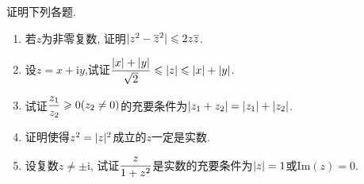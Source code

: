 \begin{yyEx}
	证明下列各题.
	\begin{enumerate}
		\item 若$z$为非零复数, 证明$\lvert z^2 - \overline{z}^2\rvert \leqslant 2z\overline{z}$.
		\item 设$z = x+\mathrm{i}y$,试证$\begin{lgathered}\frac{\abs{x}+\abs{y}}{\sqrt{2}}\leqslant \abs{z} \leqslant \abs{x}+\abs{y}\end{lgathered}$.
		\item 试证$\begin{lgathered}\frac{z_1}{z_2}\geqslant 0(z_2\neq 0)\end{lgathered}$的充要条件为$\lvert z_1+z_2\rvert = \lvert z_1\rvert+\lvert z_2\rvert$.
		\item 证明使得$z^2 = \lvert z\rvert^2$成立的$z$一定是实数.
		\item 设复数$z\neq \pm \mathrm{i}$, 试证$\begin{lgathered}\frac{z}{1+z^2}\end{lgathered}$是实数的充要条件为$\lvert z\rvert = 1$或$\mathrm{Im}(z) = 0$.
	\end{enumerate}
\end{yyEx}

